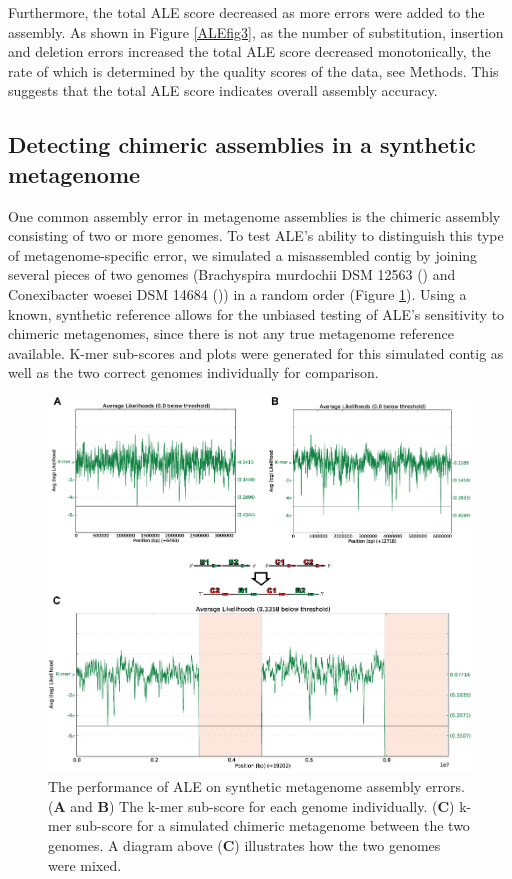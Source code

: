 \documentclass[phd,tocprelim]{cornell}
\begin{document}
Furthermore, the total ALE score decreased as more errors were added to the assembly. As shown in Figure \ref{ALEfig3}, as the number of substitution, insertion and deletion errors increased the total ALE score decreased monotonically, the rate of which is determined by the quality scores of the data, see Methods. This suggests that the total ALE score indicates overall assembly accuracy.

\subsection{Detecting chimeric assemblies in a synthetic metagenome}
One common assembly error in metagenome assemblies is the chimeric assembly consisting of two or more genomes. To test ALE’s ability to distinguish this type of metagenome-specific error, we simulated a misassembled contig by joining several pieces of two genomes (Brachyspira murdochii DSM 12563 (\cite{Pati2010}) and Conexibacter woesei DSM 14684 (\cite{Pukall2010})) in a random order (Figure \ref{ALEfig4}).  Using a known, synthetic reference allows for the unbiased testing of ALE’s sensitivity to chimeric metagenomes, since there is not any true metagenome reference available. K-mer sub-scores and plots were generated for this simulated contig as well as the two correct genomes individually for comparison.

\begin{figure}[!tpb]%
    \centerline{\includegraphics[width=\textwidth]{figures/ALE/Clark_Fig4b.png}}
    \caption[ALE performance on synthetic metagenome]{The performance of ALE on synthetic metagenome assembly errors. ({\bf A} and {\bf B}) The k-mer sub-score for each genome individually. ({\bf C}) k-mer sub-score for a simulated chimeric metagenome between the two genomes. A diagram above ({\bf C}) illustrates how the two genomes were mixed.}\label{ALEfig4}
\end{figure}
\end{document}
